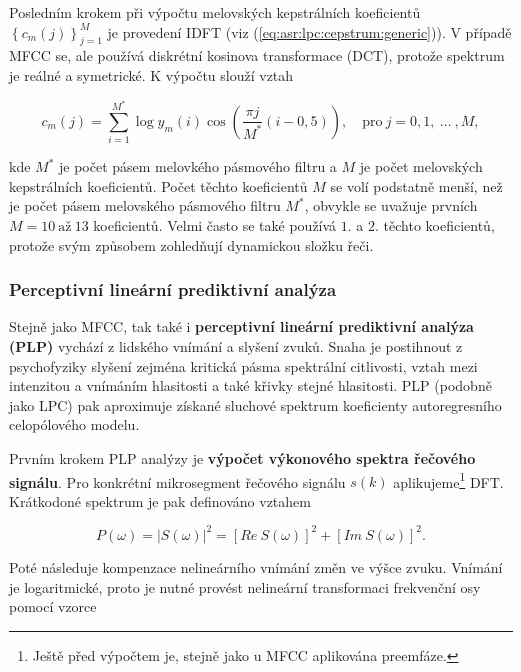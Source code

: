Posledním krokem při výpočtu melovských kepstrálních koeficientů $\left\{c_m\left(j\right)\right\}_{j=1}^{M}$ je provedení IDFT (viz (\ref{eq:asr:lpc:cepstrum:generic})). V případě MFCC se, ale používá diskrétní kosinova transformace (DCT), protože spektrum je reálné a symetrické. K výpočtu slouží vztah

\begin{equation}
  c_{m}(j) = \sum_{i=1}^{M^{*}} \log y_m(i) \cos\left( \frac{\pi j}{M^{*}}\left(i - 0,5\right) \right),  \quad \text{pro}\ j = 0, 1,\ \dots\ ,M,
  \label{eq:asr:mfcc:coef}
\end{equation}

\noindent kde $M^{*}$ je počet pásem melovkého pásmového filtru a $M$ je počet melovských kepstrálních koeficientů. Počet těchto koeficientů $M$ se volí podstatně menší, než je počet pásem melovského pásmového filtru $M^{*}$, obvykle se uvažuje prvních $M = 10\ \text{až}\ 13$ koeficientů. Velmi často se také používá $1.$ a $2.$ těchto koeficientů, protože svým způsobem zohledňují dynamickou složku řeči.

\subsubsection{Perceptivní lineární prediktivní analýza}

Stejně jako MFCC, tak také i \textbf{perceptivní lineární prediktivní analýza (PLP)} vychází z lidského vnímání a slyšení zvuků. Snaha je postihnout z psychofyziky slyšení zejména kritická pásma spektrální citlivosti, vztah mezi intenzitou a vnímáním hlasitosti a také křivky stejné hlasitosti. \cite{Psutka2006} PLP (podobně jako LPC) pak aproximuje získané sluchové spektrum koeficienty autoregresního celopólového modelu.

Prvním krokem PLP analýzy je \textbf{výpočet výkonového spektra řečového signálu}. Pro konkrétní mikrosegment řečového signálu $s(k)$ aplikujeme\footnote{Ještě před výpočtem je, stejně jako u MFCC aplikována preemfáze.} DFT. Krátkodoné spektrum je pak definováno vztahem

\begin{equation}
  P\left(\omega\right) = \left| S\left(\omega\right) \right|^{2} = \left[Re\ S\left(\omega\right)\right]^2 + \left[Im\ S\left( \omega \right) \right]^2.
  \label{eq:asr:plp:spectr}
\end{equation}

\noindent Poté následuje kompenzace nelineárního vnímání změn ve výšce zvuku. Vnímání je logaritmické, proto je nutné provést nelineární transformaci frekvenční osy pomocí vzorce

